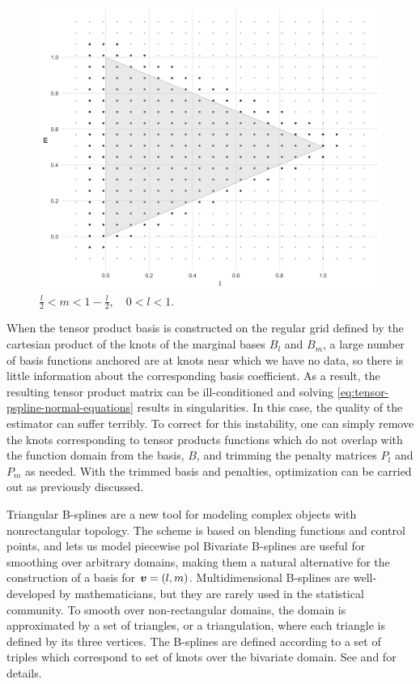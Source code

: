 \begin{figure}[H]
    \graphicspath{{img/}}
 \includegraphics[scale=0.2]{knot-removal-on-triangle-domain.png}
 \caption{$\frac{l}{2} < m < 1 - \frac{l}{2}, \quad 0 < l < 1.$} \label{fig:triangle-domain}
 \end{figure}

When the tensor product basis is constructed on the regular grid defined by the cartesian product of the knots of the marginal bases $B_l$ and $B_m$, a large number of basis functions anchored are at knots near which we have no data, so there is little information about the corresponding basis coefficient. As a result, the resulting tensor product matrix can be ill-conditioned and solving \eqref{eq:tensor-pspline-normal-equations} results in singularities. In this case, the quality of the estimator can suffer terribly. To correct for this instability, one can simply remove the knots corresponding to tensor products functions which do not overlap with the function domain from the basis, $B$, and trimming the penalty matrices $P_l$ and $P_m$ as needed. With the trimmed basis and penalties, optimization can be carried out as previously discussed. 

\bigskip

Triangular B-splines are a new tool for modeling complex objects with nonrectangular topology. The scheme is based on blending functions and control points, and lets us model piecewise pol
Bivariate B-splines are useful for smoothing over arbitrary domains, making them a natural alternative for the construction of a basis for $\mbox{\boldmath $v$} = \left(l,m\right)$. Multidimensional B-splines are well-developed by mathematicians, but they are rarely used in the statistical community. To smooth over non-rectangular domains, the domain is approximated by a set of triangles, or a triangulation, where each triangle is defined by its three vertices. The B-splines are defined according to a set of triples which correspond to set of knots over the bivariate domain. See \citet{dahmen1992blossoming} and \citet{seidel1991symmetric} for details. 

